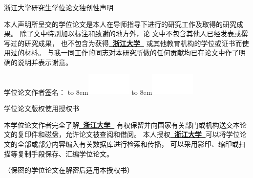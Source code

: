   \vspace*{-2mm}

  {\songti

  \begin{center}
    {\noindent\songti{}浙江大学研究生学位论文独创性声明}\\
  \end{center}

  {\setlength{\baselineskip}{1.3\baselineskip}
  本人声明所呈交的学位论文是本人在导师指导下进行的研究工作及取得的研究成果。
  除了文中特别加以标注和致谢的地方外，论
  文中不包含其他人已经发表或撰写过的研究成果，
  也不包含为获得{\bfseries\kaishu{}\underline{~浙江大学~}}
  或其他教育机构的学位或证书而使用过的材料。
  与我一同工作的同志对本研究所做的任何贡献均已在论文中作了明确的说明并表示谢意。

  \vspace{10ex}

  {\songti{}学位论文作者签名：
  \ifpdf
  {\hbox to 8em{\includegraphics[width=6em,height=3em]{./Signature/sign_cr_1.pdf}}}
  \else
  {\hbox to 8em{\includegraphics[width=6em,height=3em]{./Signature/sign_cr_1.eps}}}
  \fi
  \PutsigndateA}
  
  \vspace{12ex}

  \begin{center}
    {\noindent\songti{}学位论文版权使用授权书}
  \end{center}

  本学位论文作者完全了解{\bfseries\kaishu{}\underline{~浙江大学~}}
  有权保留并向国家有关部门或机构送交本论文的复印件和磁盘，允许论文被查阅和借阅。
  本人授权{\bfseries\kaishu{}\underline{~浙江大学~}}可以将学位论文的全部或部分内容编入有关数据库进行检索和传播，
  可以采用影印、缩印或扫描等复制手段保存、汇编学位论文。

  （保密的学位论文在解密后适用本授权书）

  \vspace{2ex}

}}
